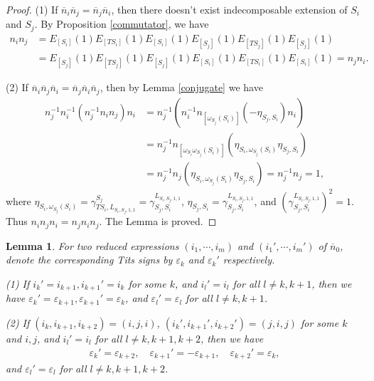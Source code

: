\documentclass[12pt]{amsart}
\newtheorem{lemma}[theorem]{Lemma}
\begin{document}
\begin{proof}
    (1) If $\overline{n}_i\overline{n}_j=\overline{n}_j\overline{n}_i$, then there doesn't exist indecomposable extension of $S_i$ and $S_j$.
    By Proposition \ref{commutator}, we have 
    \begin{align*}
        n_in_j&=E_{[S_i]}(1)E_{[TS_i]}(1)E_{[S_i]}(1)E_{[S_j]}(1)E_{[TS_j]}(1)E_{[S_j]}(1)\\
        &=E_{[S_j]}(1)E_{[TS_j]}(1)E_{[S_j]}(1)E_{[S_i]}(1)E_{[TS_i]}(1)E_{[S_i]}(1)=n_jn_i.
    \end{align*}

    (2) If $\overline{n}_i\overline{n}_j\overline{n}_i=\overline{n}_j\overline{n}_i\overline{n}_j$, then by Lemma \ref{conjugate} we have 
    \begin{align*}
        n_j^{-1} n_i^{-1} (n_j^{-1} n_i n_j) n_i &= n_j^{-1} (n_i^{-1} n_{[\omega_{S_j}(S_i)]}(-\eta_{S_j,S_i}) n_i)\\
        &=  n_j^{-1} n_{[\omega_{S_i}\omega_{S_j}(S_i)]}(\eta_{S_i,\omega_{S_j}(S_i)}\eta_{S_j,S_i})\\
        &= n_j^{-1} n_j(\eta_{S_i,\omega_{S_j}(S_i)}\eta_{S_j,S_i}) = n_j^{-1}n_j =1,
    \end{align*}
    where $\eta_{S_i,\omega_{S_j}(S_i)}=\gamma_{TS_i,L_{S_i,S_j,1,1}}^{S_j}=\gamma_{S_j,S_i}^{L_{S_i,S_j,1,1}}$, $\eta_{S_j,S_i}=\gamma_{S_j,S_i}^{L_{S_i,S_j,1,1}}$, and $(\gamma_{S_j,S_i}^{L_{S_i,S_j,1,1}})^2=1$.
    Thus $n_in_jn_i=n_jn_in_j$. The Lemma is proved.
\end{proof}

\begin{lemma}
    For two reduced expressions $(i_1,\cdots,i_m)$ and $(i_1',\cdots,i_m')$ of $\overline{n}_0$, denote the corresponding Tits signs by $\varepsilon_k$ and $\varepsilon_k'$ respectively.

    (1) If $i_k'=i_{k+1},i_{k+1}'=i_k$ for some $k$, and $i_l'=i_l$ for all $l\neq k,k+1$, then we have $\varepsilon_k'=\varepsilon_{k+1},\varepsilon_{k+1}'=\varepsilon_k$, and $\varepsilon_l'=\varepsilon_l$ for all $l\neq k,k+1$.

    (2) If $(i_k,i_{k+1},i_{k+2})=(i,j,i)$, $(i_k',i_{k+1}',i_{k+2}')=(j,i,j)$ for some $k$ and $i,j$, and $i_l'=i_l$ for all $l\neq k,k+1,k+2$, then we have
    \begin{align*}
        \varepsilon_k'=\varepsilon_{k+2}, \quad \varepsilon_{k+1}'=-\varepsilon_{k+1}, \quad \varepsilon_{k+2}'=\varepsilon_k,
    \end{align*}
    and $\varepsilon_l'=\varepsilon_l$ for all $l\neq k,k+1,k+2$.
\end{lemma}
\end{document}
